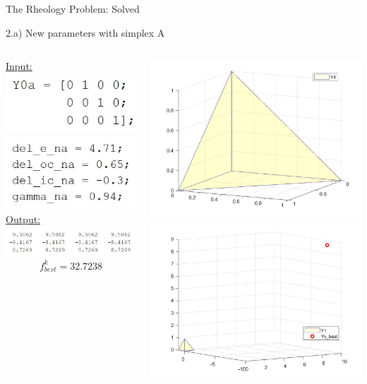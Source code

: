 \documentclass{beamer}
\begin{document}
\begin{frame}{The Rheology Problem: Solved}
\begin{block}{2.a) New parameters with simplex A}
\begin{columns}
\begin{column}{0.35\linewidth}
	\underline{Input:}\\
	\includegraphics[width=0.45\linewidth]{Y0a}\\
	\includegraphics[width=0.45\linewidth]{NewParamsA}\\
	\vspace{0.65cm}
	\underline{Output:}\\
	\includegraphics[width=0.95\linewidth]{1aSimplex}
	$$f^k_{best} = 32.7238$$
	\vspace{0.1cm}
\end{column}
\begin{column}{0.63\linewidth}
	\includegraphics[width=0.45\linewidth]{Simplex1}\\
	\vspace{5mm}
	\includegraphics[width=0.45\linewidth]{1aSimplexPlot}
\end{column}
\end{columns}
\end{block}
\end{frame}
\end{document}
